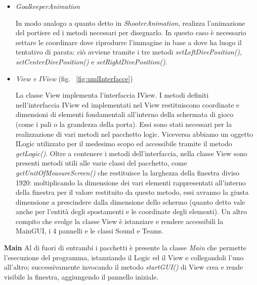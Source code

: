\documentclass[12pt,a4paper]{report}
\begin{document}
\begin{itemize}
Realizza l'animazione del tiratore ed i metodi necessari per disegnarlo: il metodo \emph{drawCurrentFrame()} si occupa di disegnare il frame corrente identificato da un indice che viene aumentato dall'\emph{actionPerformed()} del timer. Una volta arrivato all'ultimo frame in cui il tiratore calcia il pallone, invoca i metodi \emph{start()} di GoalkeeperAnimation e \emph{moveTo()} di Ball, attivando i rispettivi timer. Nel turno di parata è il primo timer ad essere attivato ed invoca i metodi necessari per generare le coordinate del tiro e rendere visibile l'indicatore.

\item\emph{GoalkeeperAnimation}

In modo analogo a quanto detto in \emph{ShooterAnimation}, realizza l'animazione del portiere ed i metodi necessari per disegnarlo. In questo caso è necessario settare le coordinare dove riprodurre l'immagine in base a dove ha luogo il tentativo di parata: ciò avviene tramite i tre metodi \emph{setLeftDivePosition()}, \emph{setCenterDivePosition()} e \emph{setRightDivePosition()}.

\item\emph{View e IView} (fig.  ~\ref{fig:umlInterfacce})

La classe View implementa l'interfaccia IView. I metodi definiti nell'interfaccia IView ed implementati nel View restituiscono coordinate e dimensioni di elementi fondamentali all'interno della schermata di gioco (come i pali o la grandezza della porta). Essi sono stati necessari per la realizzazione di vari metodi nel pacchetto logic. Viceversa abbiamo un oggetto ILogic utilizzato per il medesimo scopo ed accessibile tramite il metodo \emph{getLogic()}.
Oltre a contenere i metodi dell'interfaccia, nella classe View sono presenti metodi utili alle varie classi del pacchetto, come \emph{getUnitOfMeasureScreen()} che restituisce la larghezza della finestra diviso 1920: moltiplicando la dimensione dei vari elementi rappresentati all'interno della finestra per il valore restituito da questo metodo, essi avranno la giusta dimensione a prescindere dalla dimensione dello schermo (quanto detto vale anche per l'entità degli spostamenti e le coordinate degli elementi).
Un altro compito che svolge la classe View è istanziare e rendere accessibili la MainGUI, i 4 pannelli e le classi Sound e Teams.

\end{itemize}
\textbf{Main}\newline
Al di fuori di entrambi i pacchetti è presente la classe \emph{Main} che permette l'esecuzione del programma, istanziando il Logic ed il View e collegandoli l'uno all'altro; successivamente invocando il metodo \emph{startGUI()} di View crea e rende visibile la finestra, aggiungendo il pannello iniziale.
\end{document}
